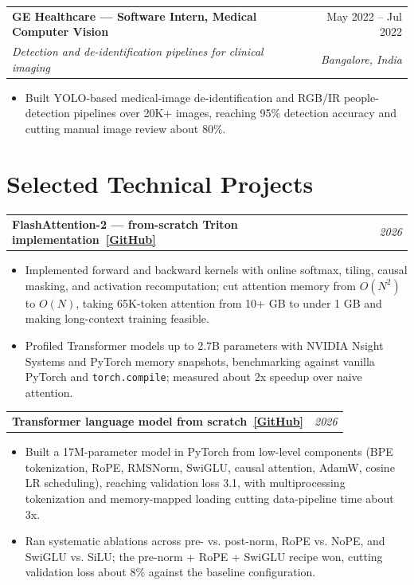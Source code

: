 \documentclass[10pt,letterpaper]{article}
\makeatletter
\newcommand{\est}[1]{\textcolor{red!70!black}{#1}}
\newcommand{\entry}[4]{%
  \begin{tabularx}{\textwidth}{@{}Xr@{}}
    \textbf{#1} & #2 \\
    \textit{#3} & \textit{#4}
  \end{tabularx}\vspace{-0.2em}
}
\newcommand{\project}[2]{%
  \begin{tabularx}{\textwidth}{@{}Xr@{}}
    \textbf{#1} & \textit{#2}
  \end{tabularx}\vspace{-0.25em}
}
\makeatother
\begin{document}
\vspace{0.65em}
\entry{GE Healthcare --- Software Intern, Medical Computer Vision}{May 2022 -- Jul 2022}{Detection and de-identification pipelines for clinical imaging}{Bangalore, India}
\begin{itemize}
  \item Built YOLO-based medical-image de-identification and RGB/IR people-detection pipelines over 20K+ images, reaching \est{95\%} detection accuracy and cutting manual image review about \est{80\%}.
\end{itemize}

\section{Selected Technical Projects}

\project{FlashAttention-2 --- from-scratch Triton implementation~\href{https://github.com/k-keshav-k/Flash-Attention}{[GitHub]}}{2026}
\begin{itemize}
  \item Implemented forward and backward kernels with online softmax, tiling, causal masking, and activation recomputation; cut attention memory from $O(N^2)$ to $O(N)$, taking 65K-token attention from \est{10+ GB} to \est{under 1 GB} and making long-context training feasible.
  \item Profiled Transformer models up to 2.7B parameters with NVIDIA Nsight Systems and PyTorch memory snapshots, benchmarking against vanilla PyTorch and \texttt{torch.compile}; measured about \est{2x} speedup over naive attention.
\end{itemize}

\vspace{0.6em}
\project{Transformer language model from scratch~\href{https://github.com/k-keshav-k/Large-Language-Models-from-Scratch}{[GitHub]}}{2026}
\begin{itemize}
  \item Built a 17M-parameter model in PyTorch from low-level components (BPE tokenization, RoPE, RMSNorm, SwiGLU, causal attention, AdamW, cosine LR scheduling), reaching validation loss \est{3.1}, with multiprocessing tokenization and memory-mapped loading cutting data-pipeline time about \est{3x}.
  \item Ran systematic ablations across pre- vs. post-norm, RoPE vs. NoPE, and SwiGLU vs. SiLU; the pre-norm + RoPE + SwiGLU recipe won, cutting validation loss about \est{8\%} against the baseline configuration.
\end{itemize}
\end{document}
